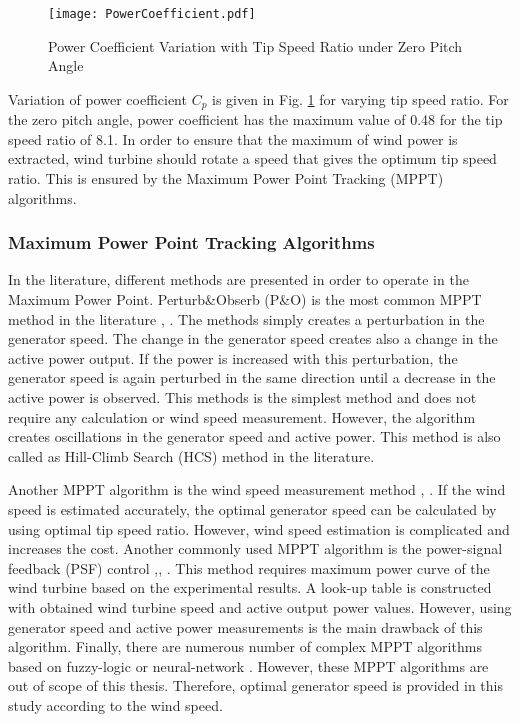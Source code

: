 \begin{figure}[h!]
	\centering
	\texttt{[image: PowerCoefficient.pdf]}
	\caption{Power Coefficient Variation with Tip Speed Ratio under Zero Pitch Angle}
	\label{variationofcp}
\end{figure} 
\par
Variation of power coefficient $C_{p}$ is given in Fig. \ref{variationofcp} for varying tip speed ratio. For the zero pitch angle, power coefficient has the maximum value of 0.48 for the tip speed ratio of 8.1. In order to ensure that the maximum of wind power is extracted, wind turbine should rotate a speed that gives the optimum tip speed ratio. This is ensured by the Maximum Power Point Tracking (MPPT) algorithms. 
\subsubsection{Maximum Power Point Tracking Algorithms}
In the literature, different methods are presented in order to operate in the Maximum Power Point. Perturb\&Obserb (P\&O) is the most common MPPT method in the literature \cite{Wang2004}, \cite{Barakati2009}. The methods simply creates a perturbation in the generator speed. The change in the generator speed creates also a change in the active power output. If the power is increased with this perturbation, the generator speed is again perturbed in the same direction until a decrease in the active power is observed. This methods is the simplest method and does not require any calculation or wind speed measurement. However, the algorithm creates oscillations in the generator speed and active power. This method is also called as Hill-Climb Search (HCS) method in the literature.\par
Another MPPT algorithm is the wind speed measurement method \cite{Thriringer1993}, \cite{C.A.2013}. If the wind speed is estimated accurately, the optimal generator speed can be calculated by using optimal tip speed ratio. However, wind speed estimation is complicated and increases the cost. Another commonly used MPPT algorithm is the power-signal feedback (PSF) control \cite{C.A.2013},\cite{Wang2004}, \cite{Lu2002}. This method requires maximum power curve of the wind turbine based on the experimental results. A look-up table is constructed with obtained wind turbine speed and active output power values. However, using generator speed and active power measurements is the main drawback of this algorithm. Finally, there are numerous number of complex MPPT algorithms based on fuzzy-logic \cite{Zeng2008} or neural-network \cite{Lin2011}. However, these MPPT algorithms are out of scope of this thesis. Therefore, optimal generator speed is provided in this study according to the wind speed. 

